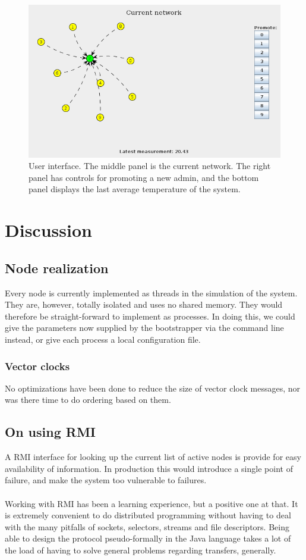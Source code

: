 \documentclass[10pt,a4paper]{article}
\begin{document}
\begin{figure}[h]
\centering
\includegraphics[scale=0.4]{fig/UI.png}
 \caption{User interface. The middle panel is the current network. The right panel has controls for promoting a new admin, and the bottom panel displays the last average temperature of the system.}
 \label{fig:ui}
\end{figure}


\section{Discussion}

\subsection{Node realization}
Every node is currently implemented as threads in the simulation of the system. They are, however, totally isolated and uses no shared memory. They would therefore be straight-forward to implement as processes. In doing this, we could give the parameters now supplied by the bootstrapper via the command line instead, or give each process a local configuration file.

\subsubsection{Vector clocks}
No optimizations have been done to reduce the size of vector clock messages, nor was there time to do ordering based on them.

\subsection{On using RMI}
A RMI interface for looking up the current list of active nodes is provide for easy availability of information. In production this would introduce a single point of failure, and make the system too vulnerable to failures.\\\\
Working with RMI has been a learning experience, but a positive one at that. It is extremely convenient to do distributed programming without having to deal with the many pitfalls of sockets, selectors, streams and file descriptors. Being able to design the protocol pseudo-formally in the Java language takes a lot of the load of having to solve general problems regarding transfers, generally.
\end{document}
